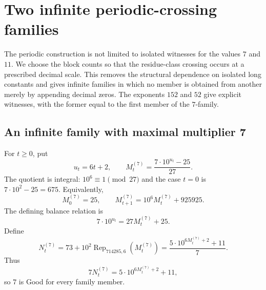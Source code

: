 \documentclass[11pt]{article}
\begin{document}
\section{Two infinite periodic-crossing families}
The periodic construction is not limited to isolated witnesses for the values $7$ and $11$.  We choose the block counts so that the residue-class crossing occurs at a prescribed decimal scale.  This removes the structural dependence on isolated long constants and gives infinite families in which no member is obtained from another merely by appending decimal zeros.  The exponents $152$ and $52$ give explicit witnesses, with the former equal to the first member of the $7$-family.

\subsection{An infinite family with maximal multiplier 7}
For $t\ge0$, put
\begin{equation}\label{eq:u7family}
 u_t=6t+2,
 \qquad
 M^{(7)}_t=\frac{7\cdot10^{u_t}-25}{27}.
\end{equation}
The quotient is integral: $10^6\equiv1\pmod{27}$ and the case $t=0$ is $7\cdot10^2-25=675$.  Equivalently,
\begin{equation}\label{eq:M7rec}
 M^{(7)}_0=25,
 \qquad
 M^{(7)}_{t+1}=10^6M^{(7)}_t+925925.
\end{equation}
The defining balance relation is
\begin{equation}\label{eq:balance7}
 7\cdot10^{u_t}=27M^{(7)}_t+25.
\end{equation}
Define
\begin{equation}\label{eq:N7family}
 N^{(7)}_t
 =73+10^2\operatorname{Rep}_{714285,6}(M^{(7)}_t)
 =\frac{5\cdot10^{6M^{(7)}_t+2}+11}{7}.
\end{equation}
Thus
\[
 7N^{(7)}_t=5\cdot10^{6M^{(7)}_t+2}+11,
\]
so $7$ is Good for every family member.
\end{document}
